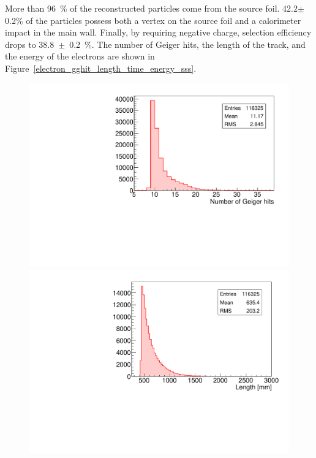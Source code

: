 \documentclass[main.tex]{subfiles}
\begin{document}
\bigskip


\noindent More than 96~\% of the reconstructed particles come from the source foil. 42.2$\pm$0.2\% of the particles possess both a vertex on the source foil and a calorimeter impact in the main wall. Finally, by requiring negative charge, selection efficiency drops to 38.8~$\pm$~0.2~$\%$.  The number of Geiger hits, the length of the track, and the energy of the electrons are shown in Figure~\ref{electron_gghit_length_time_energy_sss}.


\begin{figure}[h!]
\begin{center}
\includegraphics[scale=0.32]{pictures/Chap5/source_selection_surface_gghits.pdf}
\includegraphics[scale=0.32]{pictures/Chap5/source_selection_surface_length.pdf}

\end{center}
\end{figure}
\end{document}
